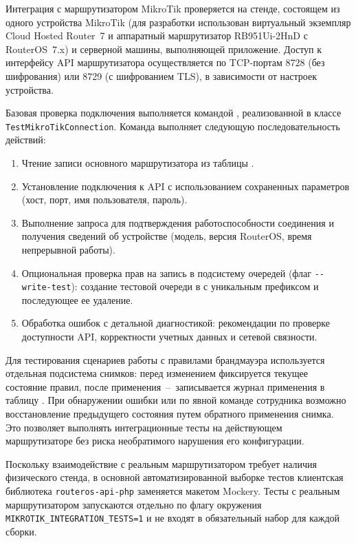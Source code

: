 Интеграция с маршрутизатором MikroTik проверяется на стенде, состоящем из одного устройства MikroTik (для разработки использован виртуальный экземпляр Cloud Hosted Router~7 и аппаратный маршрутизатор RB951Ui-2HnD с RouterOS~7.x) и серверной машины, выполняющей приложение. Доступ к интерфейсу API маршрутизатора осуществляется по TCP-портам 8728 (без шифрования) или 8729 (с шифрованием TLS), в зависимости от настроек устройства.

Базовая проверка подключения выполняется командой , реализованной в классе \texttt{TestMikroTikConnection}. Команда выполняет следующую последовательность действий:
\begin{enumerate}
\item Чтение записи основного маршрутизатора из таблицы .
\item Установление подключения к API с использованием сохраненных параметров (хост, порт, имя пользователя, пароль).
\item Выполнение запроса  для подтверждения работоспособности соединения и получения сведений об устройстве (модель, версия RouterOS, время непрерывной работы).
\item Опциональная проверка прав на запись в подсистему очередей (флаг \texttt{-{}-write-test}): создание тестовой очереди в  с уникальным префиксом и последующее ее удаление.
\item Обработка ошибок с детальной диагностикой: рекомендации по проверке доступности API, корректности учетных данных и сетевой связности.
\end{enumerate}

Для тестирования сценариев работы с правилами брандмауэра используется отдельная подсистема снимков: перед изменением фиксируется текущее состояние правил, после применения~--~записывается журнал применения в таблицу . При обнаружении ошибки или по явной команде сотрудника возможно восстановление предыдущего состояния путем обратного применения снимка. Это позволяет выполнять интеграционные тесты на действующем маршрутизаторе без риска необратимого нарушения его конфигурации.

Поскольку взаимодействие с реальным маршрутизатором требует наличия физического стенда, в основной автоматизированной выборке тестов клиентская библиотека \texttt{routeros-api-php} заменяется макетом Mockery. Тесты с реальным маршрутизатором запускаются отдельно по флагу окружения \texttt{MIKROTIK\_INTEGRATION\_TESTS=1} и не входят в обязательный набор для каждой сборки.


